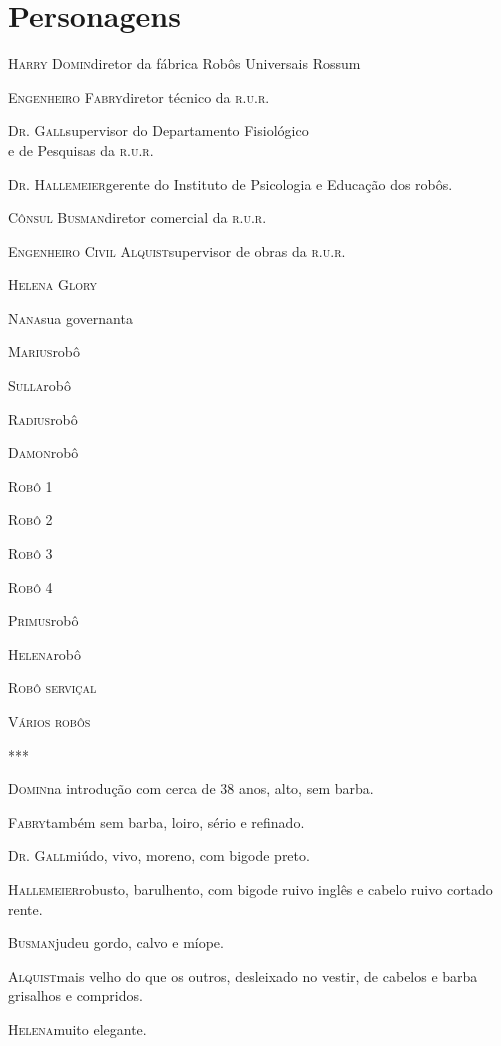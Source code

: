 \chapter{Personagens}

\textsc{Harry Domin}{diretor da fábrica Robôs Universais Rossum}

\textsc{Engenheiro Fabry}{diretor técnico da \textsc{r.u.r.}}

\textsc{Dr. Gall}{supervisor do Departamento Fisiológico\\ e de Pesquisas da
\textsc{r.u.r.}}

\textsc{Dr. Hallemeier}{gerente do Instituto de Psicologia e Educação dos robôs.}

\textsc{Cônsul Busman}{diretor comercial da \textsc{r.u.r.}}

\textsc{Engenheiro Civil Alquist}{supervisor de obras da \textsc{r.u.r.}}

\textsc{Helena Glory}

\textsc{Nana}{sua governanta}

\textsc{Marius}{robô}

\textsc{Sulla}{robô}

\textsc{Radius}{robô}

\textsc{Damon}{robô}

\textsc{Robô 1}

\textsc{Robô 2}

\textsc{Robô 3}

\textsc{Robô 4}

\textsc{Primus}{robô}

\textsc{Helena}{robô}

\textsc{Robô serviçal}

\textsc{Vários robôs}
\medskip

***

\textsc{Domin}{na introdução com cerca de 38 anos, alto, sem barba.}

\textsc{Fabry}{também sem barba, loiro, sério e refinado.}

\textsc{Dr. Gall}{miúdo, vivo, moreno, com bigode preto.}

\textsc{Hallemeier}{robusto, barulhento, com bigode ruivo inglês e cabelo ruivo cortado
rente.}

\textsc{Busman}{judeu gordo, calvo e míope.}

\textsc{Alquist}{mais velho do que os outros, desleixado no vestir, de cabelos e barba
grisalhos e compridos.}

\textsc{Helena}{muito elegante.}

